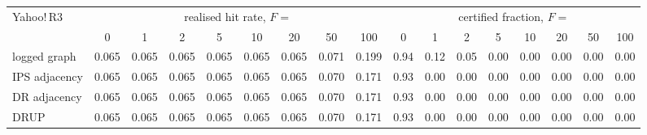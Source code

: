 \begin{tabular}{lcccccccc|cccccccc}
\toprule
Yahoo!\,R3 & \multicolumn{8}{c|}{realised hit rate, $F=$} & \multicolumn{8}{c}{certified fraction, $F=$}\\
 & 0 & 1 & 2 & 5 & 10 & 20 & 50 & 100 & 0 & 1 & 2 & 5 & 10 & 20 & 50 & 100\\
\midrule
logged graph & 0.065 & 0.065 & 0.065 & 0.065 & 0.065 & 0.065 & 0.071 & 0.199 & 0.94 & 0.12 & 0.05 & 0.00 & 0.00 & 0.00 & 0.00 & 0.00\\
IPS adjacency & 0.065 & 0.065 & 0.065 & 0.065 & 0.065 & 0.065 & 0.070 & 0.171 & 0.93 & 0.00 & 0.00 & 0.00 & 0.00 & 0.00 & 0.00 & 0.00\\
DR adjacency & 0.065 & 0.065 & 0.065 & 0.065 & 0.065 & 0.065 & 0.070 & 0.171 & 0.93 & 0.00 & 0.00 & 0.00 & 0.00 & 0.00 & 0.00 & 0.00\\
DRUP & 0.065 & 0.065 & 0.065 & 0.065 & 0.065 & 0.065 & 0.070 & 0.171 & 0.93 & 0.00 & 0.00 & 0.00 & 0.00 & 0.00 & 0.00 & 0.00\\
\bottomrule
\end{tabular}
